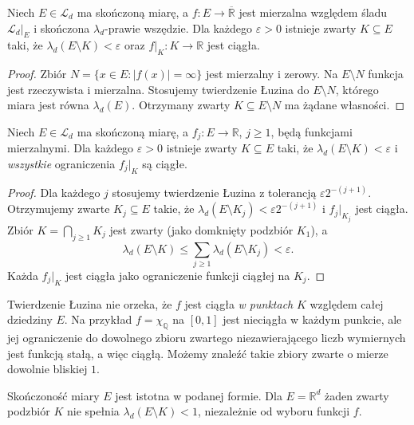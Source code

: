 \begin{wniosek}
\label{cor:lusin-finite-ae-10}
Niech $E\in\mathcal L_d$ ma skończoną miarę,
a $f:E\to\overline{\mathbb R}$ jest mierzalna względem
śladu $\mathcal L_d|_E$ i skończona $\lambda_d$-prawie
wszędzie. Dla każdego $\varepsilon>0$ istnieje
zwarty $K\subseteq E$ taki, że
$\lambda_d(E\setminus K)<\varepsilon$ oraz
$f|_K:K\to\mathbb R$ jest ciągła.
\end{wniosek}
\begin{proof}
Zbiór $N=\{x\in E:|f(x)|=\infty\}$ jest
mierzalny i zerowy. Na $E\setminus N$ funkcja
jest rzeczywista i mierzalna. Stosujemy twierdzenie
Łuzina do $E\setminus N$, którego miara jest
równa $\lambda_d(E)$. Otrzymany zwarty
$K\subseteq E\setminus N$ ma żądane własności.
\end{proof}

\begin{wniosek}
\label{cor:countable-lusin-10}
Niech $E\in\mathcal L_d$ ma skończoną miarę,
a $f_j:E\to\mathbb R$, $j\ge1$, będą
funkcjami mierzalnymi. Dla każdego $\varepsilon>0$
istnieje zwarty $K\subseteq E$ taki, że
$\lambda_d(E\setminus K)<\varepsilon$ i
\emph{wszystkie} ograniczenia $f_j|_K$ są ciągłe.
\end{wniosek}
\begin{proof}
Dla każdego $j$ stosujemy twierdzenie Łuzina
z tolerancją $\varepsilon2^{-(j+1)}$.
Otrzymujemy zwarte $K_j\subseteq E$ takie,
że $\lambda_d(E\setminus K_j)<\varepsilon2^{-(j+1)}$
i $f_j|_{K_j}$ jest ciągła.
Zbiór $K=\bigcap_{j\ge1}K_j$ jest zwarty
(jako domknięty podzbiór $K_1$), a
\[
\lambda_d(E\setminus K)
\le\sum_{j\ge1}\lambda_d(E\setminus K_j)
<\varepsilon.
\]
Każda $f_j|_K$ jest ciągła jako ograniczenie
funkcji ciągłej na $K_j$.
\end{proof}

\begin{uwaga}
\label{rem:lusin-limitations-10}
Twierdzenie Łuzina nie orzeka, że $f$ jest
ciągła \emph{w punktach} $K$ względem całej
dziedziny $E$. Na przykład $f=\chi_{\mathbb Q}$
na $[0,1]$ jest nieciągła w każdym punkcie, ale
jej ograniczenie do dowolnego zbioru zwartego
niezawierającego liczb wymiernych jest funkcją
stałą, a więc ciągłą. Możemy znaleźć takie
zbiory zwarte o mierze dowolnie bliskiej $1$.

Skończoność miary $E$ jest istotna w podanej formie.
Dla $E=\mathbb R^d$ żaden zwarty podzbiór $K$
nie spełnia $\lambda_d(E\setminus K)<1$,
niezależnie od wyboru funkcji $f$.
\end{uwaga}

